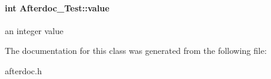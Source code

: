 \paragraph[{\texorpdfstring{value}{value}}]{\setlength{\rightskip}{0pt plus 5cm}int Afterdoc\+\_\+\+Test\+::value\hspace{0.3cm}{\ttfamily [protected]}}\hypertarget{class_afterdoc___test_a9287a08830e5cdfd9c732bb7932694a0}{}\label{class_afterdoc___test_a9287a08830e5cdfd9c732bb7932694a0}
an integer value 

The documentation for this class was generated from the following file\+:\begin{DoxyCompactItemize}
\item 
afterdoc.\+h\end{DoxyCompactItemize}
